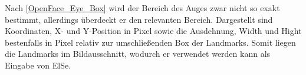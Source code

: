 Nach \autoref{OpenFace_Eye_Box} wird der Bereich des Auges zwar nicht so exakt bestimmt, allerdings überdeckt er den relevanten Bereich. Dargestellt sind Koordinaten, X- und Y-Position in Pixel sowie die Ausdehnung, Width und Hight bestenfalls in Pixel relativ zur umschließenden Box der Landmarks. Somit liegen die Landmarks im Bildausschnitt, wodurch er verwendet werden kann als Eingabe von ElSe.\\
